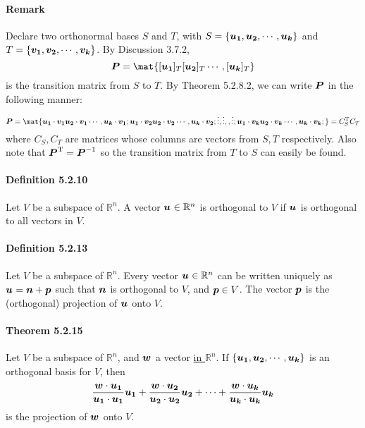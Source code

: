 \documentclass[a4paper]{article}
\newcommand{\R}{\mathbb{R}}
\newcommand{\inv}{^{-1}}
\begin{document}
\begin{multicols*}{3}
    \paragraph{Remark} Declare two orthonormal bases $S$ and $T$, with $S = \vset{\u[1], \u[2], \cdots, \u[k]}$ and $T = \vset{\v[1], \v[2], \cdots, \v[k]}$. By Discussion 3.7.2,
      \begin{equation*}
        \P = \mat{[\u[1]]_T [\u[2]]_T \cdots, [\u[k]]_T}
      \end{equation*}
      is the transition matrix from $S$ to $T$. By Theorem 5.2.8.2, we can write $\P$ in the following manner:
      \begin{equation*}
        \P = \mat{
          \u[1]\cdot\v[1] \u[2]\cdot\v[1] \cdots, \u[k]\cdot\v[1];
          \u[1]\cdot\v[2] \u[2]\cdot\v[2] \cdots, \u[k]\cdot\v[2];
          \vdots, \vdots,, \vdots;
          \u[1]\cdot\v[k] \u[2]\cdot\v[k] \cdots, \u[k]\cdot\v[k];
        } = C_S\tr C_T
      \end{equation*}
      where $C_S, C_T$ are matrices whose columns are vectors from $S, T$ respectively.
      Also note that $\P\tr = \P\inv$ so the transition matrix from $T$ to $S$ can easily be found.
    \paragraph{Definition 5.2.10} Let $V$ be a subspace of $\R^n$. A vector $\u \in \R^n$ is orthogonal to $V$ if $\u$ is orthogonal to all vectors in $V$.
    \paragraph{Definition 5.2.13} Let $V$ be a subspace of $\R^n$. Every vector $\u \in \R^n$ can be written uniquely as $\u = \n + \p$ such that $\n$ is orthogonal to $V$, and $\p \in V$. The vector $\p$ is the (orthogonal) projection of $\u$ onto $V$.
    \paragraph{Theorem 5.2.15} Let $V$ be a subspace of $\R^n$, and $\w$ a vector \underline{in $\R^n$}. If $\vset{\u[1], \u[2], \cdots, \u[k]}$ is an orthogonal basis for $V$, then
      \begin{equation*}
        \dfrac{\w \cdot \u[1]}{\u[1] \cdot \u[1]} \u[1] + \dfrac{\w \cdot \u[2]}{\u[2] \cdot \u[2]} \u[2] + \cdots + \dfrac{\w \cdot \u[k]}{\u[k] \cdot \u[k]} \u[k]
      \end{equation*}
      is the projection of $\w$ onto $V$.

\end{multicols*}
\end{document}
